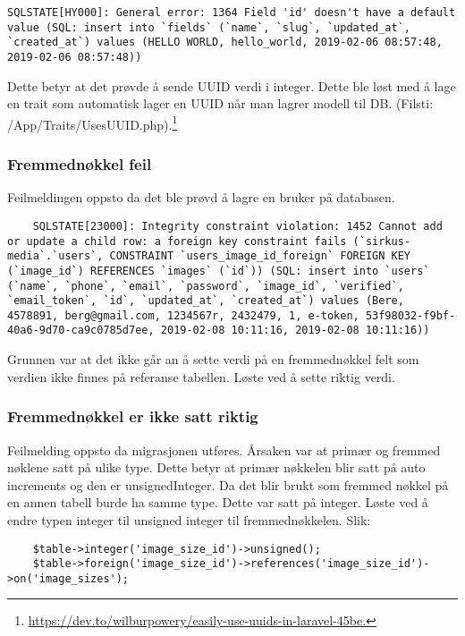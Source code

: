 \begin{lstlisting}
SQLSTATE[HY000]: General error: 1364 Field 'id' doesn't have a default value (SQL: insert into `fields` (`name`, `slug`, `updated_at`, `created_at`) values (HELLO WORLD, hello_world, 2019-02-06 08:57:48, 2019-02-06 08:57:48))
\end{lstlisting}
Dette betyr at det prøvde å sende UUID verdi i integer.
Dette ble løst med å lage en trait som automatisk lager en UUID når man lagrer modell til DB. (Filsti: /App/Traits/UsesUUID.php).\footnote{\url{ https://dev.to/wilburpowery/easily-use-uuids-in-laravel-45be.}}
 
\subsubsection{Fremmednøkkel feil}
Feilmeldingen oppsto da det ble prøvd å lagre en bruker på databasen. 

\begin{lstlisting}
    SQLSTATE[23000]: Integrity constraint violation: 1452 Cannot add or update a child row: a foreign key constraint fails (`sirkus-media`.`users`, CONSTRAINT `users_image_id_foreign` FOREIGN KEY (`image_id`) REFERENCES `images` (`id`)) (SQL: insert into `users` (`name`, `phone`, `email`, `password`, `image_id`, `verified`, `email_token`, `id`, `updated_at`, `created_at`) values (Bere, 4578891, berg@gmail.com, 1234567r, 2432479, 1, e-token, 53f98032-f9bf-40a6-9d70-ca9c0785d7ee, 2019-02-08 10:11:16, 2019-02-08 10:11:16))
\end{lstlisting}

Grunnen var at det ikke går an å sette verdi på en fremmednøkkel felt som verdien ikke finnes på referanse tabellen. Løste ved å sette riktig verdi.

\subsubsection{Fremmednøkkel er ikke satt riktig}
Feilmelding oppsto da migrasjonen utføres. 
Årsaken var at primær og fremmed nøklene satt på ulike type.
Dette betyr at primær nøkkelen blir satt på auto increments og den er unsignedInteger. Da det blir brukt som fremmed nøkkel på en annen tabell burde ha samme type. Dette var satt på integer.
Løste ved å endre typen integer til unsigned integer til fremmednøkkelen. Slik:

\begin{lstlisting}
    $table->integer('image_size_id')->unsigned();
    $table->foreign('image_size_id')->references('image_size_id')->on('image_sizes');
\end{lstlisting}

